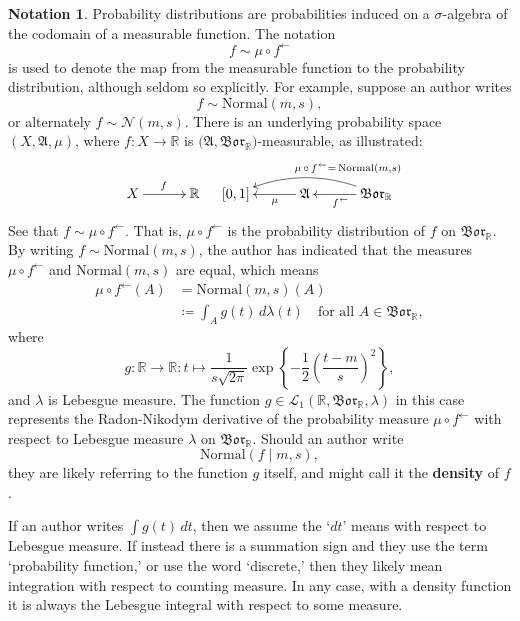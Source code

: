 \documentclass[
twoside=true,
paper=letter,
fontsize=9pt,
pagesize=auto,
leqno,
openany,
headsepline,
overfullrule,
]{scrbook}
\theoremstyle{plain}
\theoremstyle{plain}
\theoremstyle{definition}
\newtheorem{notn}[thm]{Notation}
\theoremstyle{bfnoteitalic}
\theoremstyle{bfnoteroman}
\newcommand{\term}[1]{\textbf{#1}\index{#1}}
\newcommand{\sigalg}[1]{\mathfrak{#1}}
\newcommand{\cali}[1]{\mathscr{#1}}
\newcommand{\definedby}{\coloneqq}
\newcommand{\borel}{\mathfrak{Bor}}
\newcommand{\textsigma}{\hbox{\large{$\sigma$}}\kern-1pt}
\newcommand{\preimage}[1]{#1^{\leftarrow}}
\newcommand{\R}{\mathbb{R}}
\newcommand{\sigmaalgebra}{\sigalg{A}}
\newcommand{\funcf}{f}
\newcommand{\funcg}{g}
\newcommand{\function}{f}
\newcommand{\functionii}{g}
\newcommand{\measurespace}{X}
\newcommand{\measure}{\mu}
\newcommand{\measmu}{\mu}
\newcommand{\measlambda}{\lambda}
\newcommand{\seti}{A}
\begin{document}
\begin{notn}\label{density_functions}
Probability distributions are probabilities induced on a \textsigma-algebra of the codomain of a measurable function. The notation
\[
\function \sim \measure\circ\preimage{\function}
\]
is used to denote the map from the measurable function to the probability distribution, although seldom so explicitly.
For example, suppose an author writes 
\[
\function\sim \text{Normal}(m,s),
\]
or alternately $\function\sim \cali{N}(m,s)$.
There is an underlying probability space
$(\measurespace,\sigmaalgebra,\measmu)$, where 
$\funcf:\measurespace\to\R$
is  
$\bigl(\sigmaalgebra,\borel_\R \bigr)$\hyp{}measurable,
as illustrated:
\[
\xymatrix@R=18pt@C=30pt{\measurespace \ar[r]^\funcf & \R \\}
\quad
\xymatrix@R=18pt@C=30pt{
[0,1]
& \sigmaalgebra 
\ar[l]^-\measmu
& \borel_\R
\ar[l]^{\preimage{\funcf}} 
\ar@/_12pt/[ll]_{\measmu\,\circ\,
\funcf
\makebox[0pt][l]{$\scriptstyle{^\leftarrow =\, \text{Normal}(m,s)}$}}
}
\]
%
%
%
See that
$\function\sim \measmu\circ \preimage{\function}$.
That is, $\measmu\circ \preimage{\function}$ is the probability distribution of $\function$ on 
$\borel_\R$.
By writing $\function\sim \text{Normal}(m,s)$, the author has indicated that the measures 
$\measmu\circ \preimage{\function}$ and
$\text{Normal}(m,s)$ are equal,
which means
\begin{align*}
\measmu\circ \preimage{\function}(\seti) 
&= \text{Normal}(m,s)(\seti) \\
&\definedby\int_\seti \functionii(t)\,d\lambda(t)\quad\text{for all $\seti\in\borel_\R$},
\end{align*}
where 
\[
\functionii :\R\to\R:
t\mapsto
\frac{1}{s\sqrt{2\pi}}
\exp
\left\{
-\frac{1}{2}
\left(
\frac{t-m}{s}
\right)^2
\right\},
\]
and $\measlambda$ is Lebesgue measure.
The function 
$\functionii \in\cali{L}_1(\R,\borel_\R,\lambda)$
in this case represents the Radon-Nikodym derivative of the probability measure
$\measmu \circ \preimage{\function}$
with respect to Lebesgue measure $\lambda$ on $\borel_\R$.
Should an author write 
\[\text{Normal}(\function\mid m,s),\] they are likely referring to the function $\functionii$ itself, and might call it the \term{density} of $\function$. 

If an author  writes $\int \funcg(t)\,dt$, then we assume the `$dt$' means with respect to Lebesgue measure. If instead there is a summation sign and they use the term `probability function,' or use the word `discrete,' then they likely mean integration with respect to counting measure.  In any case, with a density function it is always the Lebesgue integral with respect to some measure.
\end{notn}
\end{document}
